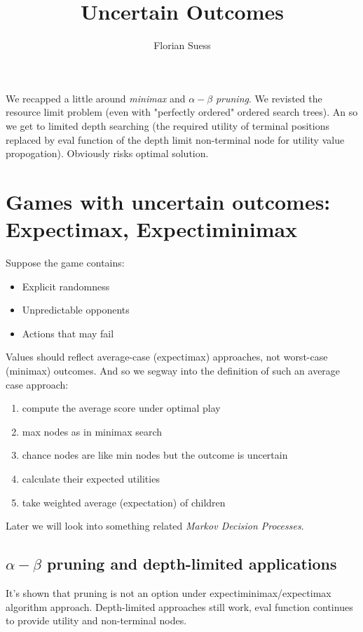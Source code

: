 \documentclass{article}
\begin{document}
\title{Uncertain Outcomes}
\date{}
\author{Florian Suess}
\maketitle

We recapped a little around \emph{minimax} and $\alpha-\beta$ \emph{pruning}. We revisted the resource limit problem (even with "perfectly ordered" ordered search trees). An so we get to limited depth searching (the required utility of terminal positions replaced by eval function of the depth limit non-terminal node for utility value propogation). Obviously risks optimal solution.

\section{Games with uncertain outcomes: Expectimax, Expectiminimax}
Suppose the game contains:
\begin{itemize}
	\item Explicit randomness
	\item Unpredictable opponents
	\item Actions that may fail
\end{itemize}

Values should reflect average-case (expectimax) approaches, not worst-case (minimax) outcomes. And so we segway into the definition of such an average case approach:

\begin{enumerate}
	\item compute the average score under optimal play
	\item max nodes as in minimax search
	\item chance nodes are like min nodes but the outcome is uncertain
	\item calculate their expected utilities
	\item take weighted average (expectation) of children
\end{enumerate}

Later we will look into something related \emph{Markov Decision Processes}.

\subsection{$\alpha-\beta$ pruning and depth-limited applications}
It's shown that pruning is not an option under expectiminimax/expectimax algorithm approach. Depth-limited approaches still work, eval function continues to provide utility and non-terminal nodes.
\end{document}
